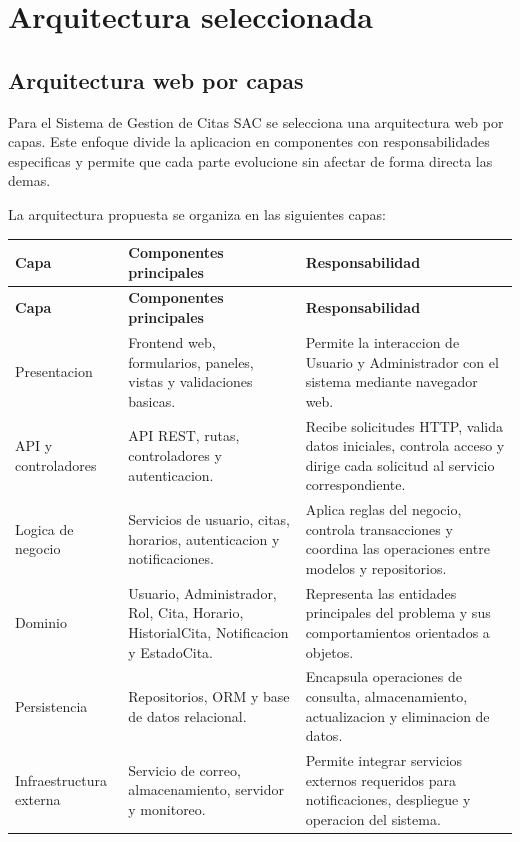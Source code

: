 \documentclass[12pt,letterpaper]{article}
\begin{document}
\section{Arquitectura seleccionada}

\subsection{Arquitectura web por capas}

Para el Sistema de Gestion de Citas SAC se selecciona una arquitectura web por capas. Este enfoque divide la aplicacion en componentes con responsabilidades especificas y permite que cada parte evolucione sin afectar de forma directa las demas.

La arquitectura propuesta se organiza en las siguientes capas:

\begin{longtable}{|p{3.6cm}|p{4.3cm}|p{6.1cm}|}
\hline
\textbf{Capa} & \textbf{Componentes principales} & \textbf{Responsabilidad} \\
\hline
\endfirsthead
\hline
\textbf{Capa} & \textbf{Componentes principales} & \textbf{Responsabilidad} \\
\hline
\endhead
\hline
\endfoot
\hline
\endlastfoot

Presentacion & Frontend web, formularios, paneles, vistas y validaciones basicas. & Permite la interaccion de Usuario y Administrador con el sistema mediante navegador web. \\
\hline

API y controladores & API REST, rutas, controladores y autenticacion. & Recibe solicitudes HTTP, valida datos iniciales, controla acceso y dirige cada solicitud al servicio correspondiente. \\
\hline

Logica de negocio & Servicios de usuario, citas, horarios, autenticacion y notificaciones. & Aplica reglas del negocio, controla transacciones y coordina las operaciones entre modelos y repositorios. \\
\hline

Dominio & Usuario, Administrador, Rol, Cita, Horario, HistorialCita, Notificacion y EstadoCita. & Representa las entidades principales del problema y sus comportamientos orientados a objetos. \\
\hline

Persistencia & Repositorios, ORM y base de datos relacional. & Encapsula operaciones de consulta, almacenamiento, actualizacion y eliminacion de datos. \\
\hline

Infraestructura externa & Servicio de correo, almacenamiento, servidor y monitoreo. & Permite integrar servicios externos requeridos para notificaciones, despliegue y operacion del sistema. \\
\hline
\end{longtable}
\end{document}

